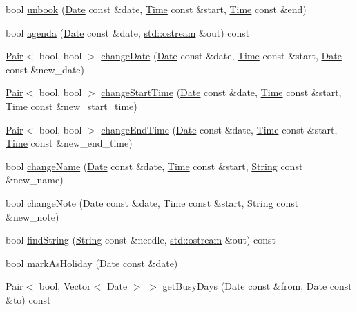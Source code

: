 \begin{DoxyCompactItemize}
\item 
bool \hyperlink{classProgram_a86a0e7e6c345dd50643cc6f466fb965a}{unbook} (\hyperlink{classDate}{Date} const \&date, \hyperlink{classTime}{Time} const \&start, \hyperlink{classTime}{Time} const \&end)
\item 
bool \hyperlink{classProgram_a36916661bfce488ed07dbc2a7f3fadce}{agenda} (\hyperlink{classDate}{Date} const \&date, \hyperlink{doctest_8h_a116af65cb5e924b33ad9d9ecd7a783f3}{std\+::ostream} \&out) const
\item 
\hyperlink{structPair}{Pair}$<$ bool, bool $>$ \hyperlink{classProgram_a4a25f61fe0747f0f13ace13b310ed7a3}{change\+Date} (\hyperlink{classDate}{Date} const \&date, \hyperlink{classTime}{Time} const \&start, \hyperlink{classDate}{Date} const \&new\+\_\+date)
\item 
\hyperlink{structPair}{Pair}$<$ bool, bool $>$ \hyperlink{classProgram_afb92c7d470233331feb450698ea66531}{change\+Start\+Time} (\hyperlink{classDate}{Date} const \&date, \hyperlink{classTime}{Time} const \&start, \hyperlink{classTime}{Time} const \&new\+\_\+start\+\_\+time)
\item 
\hyperlink{structPair}{Pair}$<$ bool, bool $>$ \hyperlink{classProgram_a8038bf54fd0e358c48d02ced033b6848}{change\+End\+Time} (\hyperlink{classDate}{Date} const \&date, \hyperlink{classTime}{Time} const \&start, \hyperlink{classTime}{Time} const \&new\+\_\+end\+\_\+time)
\item 
bool \hyperlink{classProgram_a606ccb02438885b2894843613d6de157}{change\+Name} (\hyperlink{classDate}{Date} const \&date, \hyperlink{classTime}{Time} const \&start, \hyperlink{classString}{String} const \&new\+\_\+name)
\item 
bool \hyperlink{classProgram_a63f49d8259cb4038274a1cb6e9b82374}{change\+Note} (\hyperlink{classDate}{Date} const \&date, \hyperlink{classTime}{Time} const \&start, \hyperlink{classString}{String} const \&new\+\_\+note)
\item 
bool \hyperlink{classProgram_af80c02ad4f189ee0d6c67ccc7efdc814}{find\+String} (\hyperlink{classString}{String} const \&needle, \hyperlink{doctest_8h_a116af65cb5e924b33ad9d9ecd7a783f3}{std\+::ostream} \&out) const
\item 
bool \hyperlink{classProgram_ad14086e73ec4aef58c705e3a19089d97}{mark\+As\+Holiday} (\hyperlink{classDate}{Date} const \&date)
\item 
\hyperlink{structPair}{Pair}$<$ bool, \hyperlink{classVector}{Vector}$<$ \hyperlink{classDate}{Date} $>$ $>$ \hyperlink{classProgram_af91512a81cffe079b6c300f47df906e8}{get\+Busy\+Days} (\hyperlink{classDate}{Date} const \&from, \hyperlink{classDate}{Date} const \&to) const

\end{DoxyCompactItemize}
